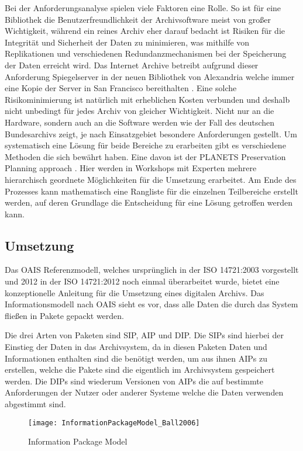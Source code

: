 \documentclass[conference,compsoc,final,a4paper]{IEEEtran}
\begin{document}
Bei der Anforderungsanalyse spielen viele Faktoren eine Rolle. So ist für eine Bibliothek die Benutzerfreundlichkeit der Archivsoftware meist von großer Wichtigkeit, während ein reines Archiv eher darauf bedacht ist Risiken für die Integrität und Sicherheit der Daten zu minimieren, was mithilfe von Replikationen und verschiedenen Redundanzmechanismen bei der Speicherung der Daten erreicht wird. Das Internet Archive betreibt aufgrund dieser Anforderung Spiegelserver in der neuen Bibliothek von Alexandria welche immer eine Kopie der Server in San Francisco bereithalten \autocite{BibAlexIAMirror}. Eine solche Risikominimierung ist natürlich mit erheblichen Kosten verbunden und deshalb nicht unbedingt für jedes Archiv von gleicher Wichtigkeit. Nicht nur an die Hardware, sondern auch an die Software werden wie der Fall des deutschen Bundesarchivs zeigt, je nach Einsatzgebiet besondere Anforderungen gestellt. Um systematisch eine Lösung für beide Bereiche zu erarbeiten gibt es verschiedene Methoden die sich bewährt haben. Eine davon ist der PLANETS Preservation Planning approach \autocite{Strodl2007}. Hier werden in Workshops mit Experten mehrere hierarchisch geordnete Möglichkeiten für die Umsetzung erarbeitet. Am Ende des Prozesses kann mathematisch eine Rangliste für die einzelnen Teilbereiche erstellt werden, auf deren Grundlage die Entscheidung für eine Lösung getroffen werden kann.

\subsection{Umsetzung}
Das \ac{OAIS} Referenzmodell, welches ursprünglich in der ISO 14721:2003 vorgestellt und 2012 in der ISO 14721:2012 noch einmal überarbeitet wurde, bietet eine konzeptionelle Anleitung für die Umsetzung eines digitalen Archivs. Das Informationsmodell nach \ac{OAIS} sieht es vor, dass alle Daten die durch das System fließen in Pakete gepackt werden.

Die drei Arten von Paketen sind \ac{SIP}, \ac{AIP} und \ac{DIP}. Die \ac{SIP}s sind hierbei der Einstieg der Daten in das Archivsystem, da in diesen Paketen Daten und Informationen enthalten sind die benötigt werden, um aus ihnen \ac{AIP}s zu erstellen, welche die Pakete sind die eigentlich im Archivsystem gespeichert werden. Die \ac{DIP}s sind wiederum Versionen von \ac{AIP}s die auf bestimmte Anforderungen der Nutzer oder anderer Systeme welche die Daten verwenden abgestimmt sind. 

\begin{figure}[!ht]
\centering
\texttt{[image: InformationPackageModel\_Ball2006]}
\caption{Information Package Model \autocite{Ball2006}}
\label{oais}
\end{figure}
\end{document}
